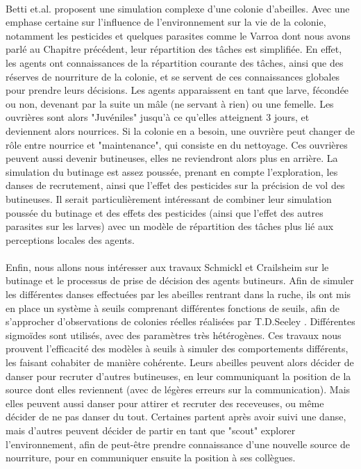         \paragraph{}
        Betti et.al. \cite{betti_bee_2017} proposent une simulation complexe d'une colonie d'abeilles. Avec une emphase certaine sur l'influence de l'environnement sur la vie de la colonie, notamment les pesticides et quelques parasites comme le Varroa dont nous avons parlé au Chapitre précédent, leur répartition des tâches est simplifiée. En effet, les agents ont connaissances de la répartition courante des tâches, ainsi que des réserves de nourriture de la colonie, et se servent de ces connaissances globales pour prendre leurs décisions.
         Les agents apparaissent en tant que larve, fécondée ou non, devenant par la suite un mâle (ne servant à rien) ou une femelle. Les ouvrières sont alors "Juvéniles" jusqu'à ce qu'elles atteignent 3 jours, et deviennent alors nourrices. Si la colonie en a besoin, une ouvrière peut changer de rôle entre nourrice et "maintenance", qui consiste en du nettoyage. Ces ouvrières peuvent aussi devenir butineuses, elles ne reviendront alors plus en arrière.
         La simulation du butinage est assez poussée, prenant en compte l'exploration, les danses de recrutement, ainsi que l'effet des pesticides sur la précision de vol des butineuses. Il serait particulièrement intéressant de combiner leur simulation poussée du butinage et des effets des pesticides (ainsi que l'effet des autres parasites sur les larves) avec un modèle de répartition des tâches plus lié aux perceptions locales des agents.
        
        \paragraph{}
        Enfin, nous allons nous intéresser aux travaux Schmickl et Crailsheim \cite{schmickl_costs_2004} sur le butinage et le processus de prise de décision des agents butineurs. Afin de simuler les différentes danses effectuées par les abeilles rentrant dans la ruche, ils ont mis en place un système à seuils comprenant différentes fonctions de seuils, afin de s'approcher d'observations de colonies réelles réalisées par T.D.Seeley \cite{seeley_tremble_1992}. Différentes sigmoïdes sont utilisés, avec des paramètres très hétérogènes. Ces travaux nous prouvent l'efficacité des modèles à seuils à simuler des comportements différents, les faisant cohabiter de manière cohérente. Leurs abeilles peuvent alors décider de danser pour recruter d'autres butineuses, en leur communiquant la position de la source dont elles reviennent (avec de légères erreurs sur la communication). Mais elles peuvent aussi danser pour attirer et recruter des receveuses, ou même décider de ne pas danser du tout. Certaines partent après avoir suivi une danse, mais d'autres peuvent décider de partir en tant que "scout" explorer l'environnement, afin de peut-être prendre connaissance d'une nouvelle source de nourriture, pour en communiquer ensuite la position à ses collègues.
        
